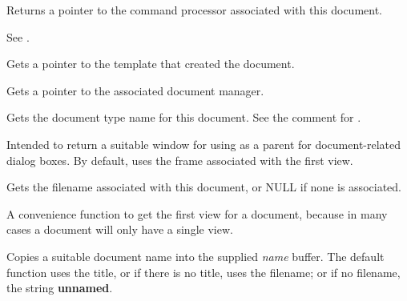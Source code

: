 
Returns a pointer to the command processor associated with this document.

See .



Gets a pointer to the template that created the document.



Gets a pointer to the associated document manager.



Gets the document type name for this document. See the comment for .



Intended to return a suitable window for using as a parent for document-related
dialog boxes. By default, uses the frame associated with the first view.



Gets the filename associated with this document, or NULL if none is
associated.



A convenience function to get the first view for a document, because
in many cases a document will only have a single view.



Copies a suitable document name into the supplied {\it name} buffer. The default
function uses the title, or if there is no title, uses the filename; or if no
filename, the string {\bf unnamed}. 


